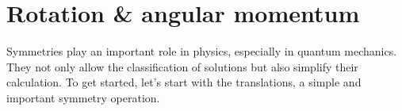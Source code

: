 \chapter{Rotation \& angular momentum}

\begin{comment}
\begin{figure}[ht]
    \centering
    \texttt{[image: 1\_1.PNG]}
    \captionsetup{font={Large}}
    \caption{The double-slit experiment: those emitted by the source particles/waves hit a screen with two overlays columns and are analyzed in the detector.}
    \label{fig:1.1}
\end{figure}
\\
\end{comment}

Symmetries play an important role in physics, especially in quantum mechanics. They not only allow the classification of solutions but also simplify their calculation. To get started, let's start with the translations, a simple and important symmetry operation.

